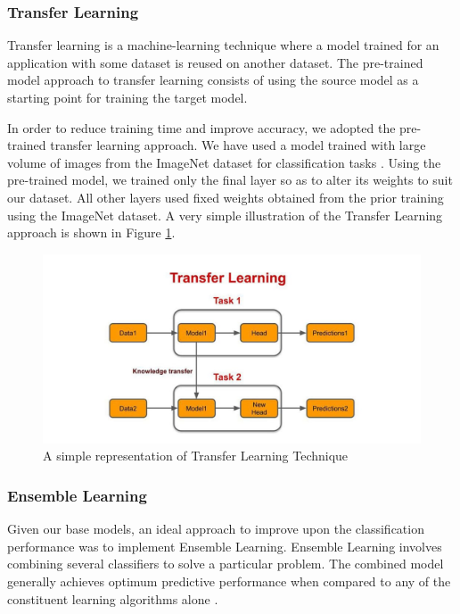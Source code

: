 \subsubsection{Transfer Learning} \label{tl}
Transfer learning is a machine-learning technique where a model trained for an application with some dataset is reused on another dataset. The pre-trained model approach to transfer learning consists of using the source model as a starting point for training the target model. 

In order to reduce training time and improve accuracy, we adopted the pre-trained transfer learning approach. We have used a model trained with large volume of images from the ImageNet dataset for classification tasks \cite{IMG}. Using the pre-trained model, we trained only the final layer so as to alter its weights to suit our dataset. All other layers used fixed weights obtained from the prior training using the ImageNet dataset. A very simple illustration of the Transfer Learning approach is shown in Figure \ref{fig:transfer learning}. 


\begin{figure}[htbp]
	\centering
	\includegraphics[width=15cm]{Images/Transfer Learning.jpg}
	\caption{\small A simple representation of Transfer Learning Technique \cite{TBT2019}}
	\label{fig:transfer learning}
\end{figure}

\subsubsection{Ensemble Learning} \label{elx}

Given our base models, an ideal approach to improve upon the classification performance was to implement Ensemble Learning. Ensemble Learning involves combining several classifiers to solve a particular problem. The combined model generally achieves optimum predictive performance when compared to any of the constituent learning algorithms alone \cite{POL2019, LUT2017}.

